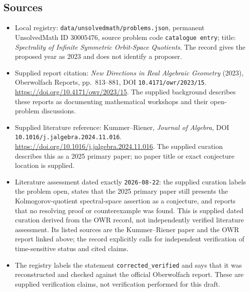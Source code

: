 \documentclass[11pt]{article}
\begin{document}
\subsection{Sources}
\begin{itemize}
\item Local registry: \texttt{data/unsolvedmath/problems.json}, permanent UnsolvedMath ID \(30005476\), source problem code \texttt{catalogue entry}; title: \emph{Spectrality of Infinite Symmetric Orbit-Space Quotients}. The record gives the proposed year as 2023 and does not identify a proposer.
\item Supplied report citation: \emph{New Directions in Real Algebraic Geometry} (2023), Oberwolfach Reports, pp.\ 813--881, DOI \texttt{10.4171/owr/2023/15}. \url{https://doi.org/10.4171/owr/2023/15}. The supplied background describes these reports as documenting mathematical workshops and their open-problem discussions.
\item Supplied literature reference: Kummer--Riener, \emph{Journal of Algebra}, DOI \texttt{10.1016/j.jalgebra.2024.11.016}. \url{https://doi.org/10.1016/j.jalgebra.2024.11.016}. The supplied curation describes this as a 2025 primary paper; no paper title or exact conjecture location is supplied.
\item Literature assessment dated exactly \texttt{2026-08-22}: the supplied curation labels the problem open, states that the 2025 primary paper still presents the Kolmogorov-quotient spectral-space assertion as a conjecture, and reports that no resolving proof or counterexample was found. This is supplied dated curation derived from the OWR record, not independently verified literature assessment. Its listed sources are the Kummer--Riener paper and the OWR report linked above; the record explicitly calls for independent verification of time-sensitive status and cited claims.
\item The registry labels the statement \texttt{corrected\_verified} and says that it was reconstructed and checked against the official Oberwolfach report. These are supplied verification claims, not verification performed for this draft.
\end{itemize}
\end{document}
